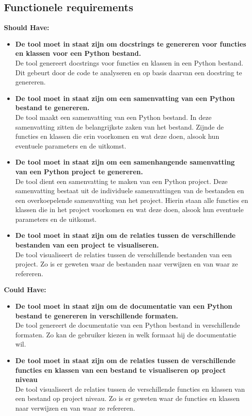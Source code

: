\subsection{Functionele requirements}
\label{sec:functionele-requirements}
\textbf{Should Have:}
\begin{itemize}
    \item \textbf{De tool moet in staat zijn om docstrings te genereren voor functies en klassen voor een Python bestand.}\\
    De tool genereert docstrings voor functies en klassen in een Python bestand. Dit gebeurt door de code te analyseren en op basis daarvan een docstring te genereren.
    \item \textbf{De tool moet in staat zijn om een samenvatting van een Python bestand te genereren.}\\
    De tool maakt een samenvatting van een Python bestand. In deze samenvatting zitten de belangrijkste zaken van het bestand.
    Zijnde de functies en klassen die erin voorkomen en wat deze doen, alsook hun eventuele parameters en de uitkomst.
    \item \textbf{De tool moet in staat zijn om een samenhangende samenvatting van een Python project te genereren.}\\
    De tool dient een samenvatting te maken van een Python project. Deze samenvatting bestaat uit de individuele samenvattingen van de bestanden en een overkoepelende samenvatting van het project.
    Hierin staan alle functies en klassen die in het project voorkomen en wat deze doen, alsook hun eventuele parameters en de uitkomst.
    \item \textbf{De tool moet in staat zijn om de relaties tussen de verschillende bestanden van een project te visualiseren.}\\
    De tool visualiseert de relaties tussen de verschillende bestanden van een project. Zo is er geweten waar de bestanden naar verwijzen en van waar ze refereren.
\end{itemize}

\textbf{Could Have:}
\begin{itemize}
    \item \textbf{De tool moet in staat zijn om de documentatie van een Python bestand te genereren in verschillende formaten.}\\
    De tool genereert de documentatie van een Python bestand in verschillende formaten. Zo kan de gebruiker kiezen in welk formaat hij de documentatie wil.
    \item \textbf{De tool moet in staat zijn om de relaties tussen de verschillende functies en klassen van een bestand te visualiseren op project niveau}\\
    De tool visualiseert de relaties tussen de verschillende functies en klassen van een bestand op project niveau. Zo is er geweten waar de functies en klassen naar verwijzen en van waar ze refereren.
\end{itemize}


